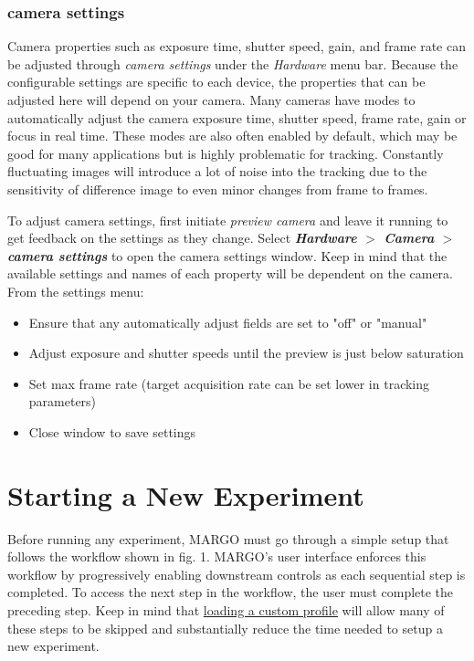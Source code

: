 \documentclass[11pt]{article}
\begin{document}
\hypertarget{camsettings}{\subsubsection{camera settings}}

Camera properties such as exposure time, shutter speed, gain, and frame rate can be adjusted through \textit{camera settings} under the \textit{Hardware} menu bar. Because the configurable settings are specific to each device, the properties that can be adjusted here will depend on your camera. Many cameras have modes to automatically adjust the camera exposure time, shutter speed, frame rate, gain or focus in real time. These modes are also often enabled by default, which may be good for many applications but is highly problematic for tracking. Constantly fluctuating images will introduce a lot of noise into the tracking due to the sensitivity of difference image to even minor changes from frame to frames.

To adjust camera settings, first initiate \textit{preview camera} and leave it running to get feedback on the settings as they change. Select \textbf{\textit{Hardware} $>$ \textit{Camera} $>$ \textit{camera settings}} to open the camera settings window. Keep in mind that the available settings and names of each property will be dependent on the camera. From the settings menu:

\begin{itemize}
	\itemsep0em 
	\item Ensure that any automatically adjust fields are set to "off" or "manual"
	\item Adjust exposure and shutter speeds until the preview is just below saturation
	\item Set max frame rate (target acquisition rate can be set lower in tracking parameters)
	\item Close window to save settings
\end{itemize} 

\section{Starting a New Experiment}

Before running any experiment, MARGO must go through a simple setup that follows the workflow shown in fig. 1. MARGO's user interface enforces this workflow by progressively enabling downstream controls as each sequential step is completed. To access the next step in the workflow, the user must complete the preceding step. Keep in mind that \hyperlink{saveprofile}{loading a custom profile} will allow many of these steps to be skipped and substantially reduce the time needed to setup a new experiment.
\end{document}
